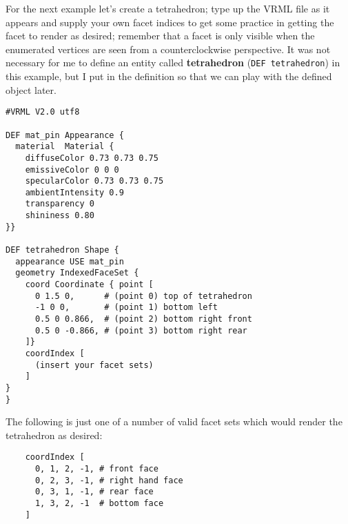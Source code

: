 \documentclass[a4paper, dvipdfm]{article}
\begin{document}
For the next example let's create a tetrahedron; type up the VRML file as it appears and supply your own facet
indices to get some practice in getting the facet to render as desired; remember that a facet is only visible
when the enumerated vertices are seen from a counterclockwise perspective. It was not necessary for me to
define an entity called \textbf{tetrahedron} (\verb~DEF tetrahedron~) in this example, but I put in the definition
so that we can play with the defined object later.

\begin{verbatim}
#VRML V2.0 utf8

DEF mat_pin Appearance {
  material  Material {
    diffuseColor 0.73 0.73 0.75
    emissiveColor 0 0 0
    specularColor 0.73 0.73 0.75
    ambientIntensity 0.9
    transparency 0
    shininess 0.80
}}

DEF tetrahedron Shape {
  appearance USE mat_pin
  geometry IndexedFaceSet {
    coord Coordinate { point [
      0 1.5 0,      # (point 0) top of tetrahedron
      -1 0 0,       # (point 1) bottom left
      0.5 0 0.866,  # (point 2) bottom right front
      0.5 0 -0.866, # (point 3) bottom right rear
    ]}
    coordIndex [
      (insert your facet sets)
    ]
}
}
\end{verbatim}

The following is just one of a number of valid facet sets which would render the tetrahedron as desired:

\begin{verbatim}
    coordIndex [
      0, 1, 2, -1, # front face
      0, 2, 3, -1, # right hand face
      0, 3, 1, -1, # rear face
      1, 3, 2, -1  # bottom face
    ]
\end{verbatim}
\end{document}
